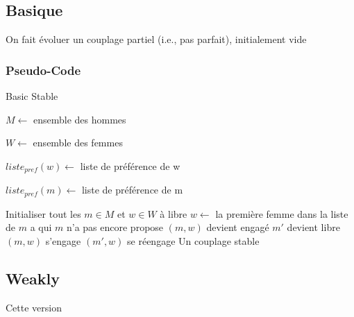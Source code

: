 \documentclass[11pt]{article}
\begin{document}
\subsection{Basique}
On fait évoluer un couplage partiel (i.e., pas parfait), initialement vide
\subsubsection{Pseudo-Code}
\begin{algorithm}
\caption{Basic Stable}
\begin{algorithmic} 
\REQUIRE 
\begin{list}{}{'}
	\item $M \leftarrow$ ensemble des hommes
	\item $W \leftarrow$ ensemble des femmes
    \item $liste_{pref}(w) \leftarrow$ liste de préférence de w 
    \item $liste_{pref}(m) \leftarrow$ liste de préférence de m
\end{list}      

\STATE Initialiser tout les $m \in M$ et $w \in W$ à libre
\STATE $w \leftarrow$ la première femme dans la liste de $m$ a qui $m$ n'a pas
encore propose
\STATE $(m, w)$ devient engagé
\STATE $m'$ devient libre
\STATE $(m, w)$ s'engage
\ELSE
\STATE $(m', w)$ se réengage
\ENDIF
\ENDIF
\ENDWHILE 
\ENSURE Un couplage stable
\end{algorithmic}
\end{algorithm}

\subsection{Weakly}
Cette version 
\end{document}
